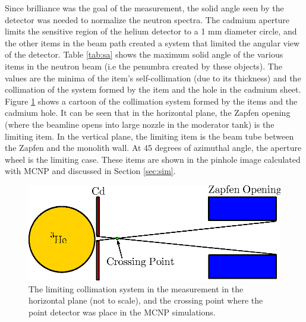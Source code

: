 \documentclass[5p,12pt]{elsarticle}
\begin{document}
Since brilliance was the goal of the measurement, the solid angle seen by the detector was needed to normalize the neutron spectra.  The cadmium aperture limits the sensitive region of the helium detector to a 1 mm diameter circle, and the other items in the beam path created a system that limited the angular view of the detector.  Table \ref{tab:sa} shows the maximum solid angle of the various items in the neutron beam (i.e the penumbra created by these objects).  The values are the minima of the item's self-collimation (due to its thickness) and the collimation of the system formed by the item and the hole in the cadmium sheet.  Figure \ref{fig:solid_angle} shows a cartoon of the collimation system formed by the items and the cadmium hole.  It can be seen that in the horizontal plane, the Zapfen opening (where the beamline opens into large nozzle in the moderator tank) is the limiting item.  In the vertical plane, the limiting item is the beam tube between the Zapfen and the monolith wall.  At 45 degrees of azimuthal angle, the aperture wheel is the limiting case.  These items are shown in the pinhole image calculated with MCNP and discussed in Section \ref{sec:sim}.

\begin{figure}[h!] 
  \centering
    \includegraphics[width=\columnwidth]{graphics/solid_angle.eps}
     \caption{The limiting collimation system in the measurement in the horizontal plane (not to scale), and the crossing point where the point detector was place in the MCNP simulations. \label{fig:solid_angle}}
\end{figure}
\end{document}
